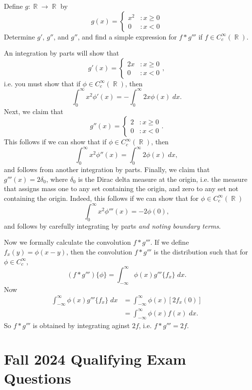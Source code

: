 \documentclass[answers]{exam}
\DeclareMathOperator{\RR}{\mathbb{R}}
\begin{document}
\begin{questions}
\question Define $g: \RR \to \RR$ by
%
\[ g(x) = \begin{cases} x^2 &: x \geq 0 \\ 0 &: x < 0 \end{cases} \]
%
Determine $g'$, $g''$, and $g''$, and find a simple expression for $f * g'''$ if $f \in C_c^\infty(\RR)$.
\begin{solution}
	An integration by parts will show that
	\[ g'(x) = \begin{cases} 2x &: x \geq 0 \\ 0 &: x < 0 \end{cases}, \]
	i.e. you must show that if $\phi \in C_c^\infty(\RR)$, then
	\[ \int_0^\infty x^2 \phi'(x) = - \int_0^\infty 2x \phi(x)\; dx. \]
	Next, we claim that
	\[ g''(x) = \begin{cases} 2 &: x \geq 0 \\ 0 &: x < 0 \end{cases}. \]
	This follows if we can show that if $\phi \in C_c^\infty(\RR)$, then
	\[ \int_0^\infty x^2 \phi''(x) = \int_0^\infty 2 \phi(x)\; dx, \]
	and follows from another integration by parts. Finally, we claim that $g'''(x) = 2 \delta_0$, where $\delta_0$ is the Dirac delta measure at the origin, i.e. the measure that assigns mass one to any set containing the origin, and zero to any set not containing the origin. Indeed, this follows if we can show that for $\phi \in C_c^\infty(\RR)$
	\[ \int_0^\infty x^2 \phi'''(x) = - 2 \phi(0), \]
	and follows by carefully integrating by parts \emph{and noting boundary terms}.

	Now we formally calculate the convolution $f * g'''$. If we define $f_x(y) = \phi(x - y)$, then the convolution $f * g'''$ is the distribution such that for $\phi \in C_c^\infty$,
	\[ (f * g''') \{ \phi \} = \int_{-\infty}^\infty \phi(x) g''' \{ f_x \}\; dx. \]
	Now
	\begin{align*}
		\int_{-\infty}^\infty \phi(x) g''' \{ f_x \}\; dx &= \int_{-\infty}^\infty \phi(x) [ 2f_x(0) ]\\
		&= \int_{-\infty}^\infty \phi(x) f(x)\; dx.
	\end{align*}
	So $f * g'''$ is obtained by integrating aginst $2f$, i.e. $f * g''' = 2f$.
\end{solution}

\newpage
\section{Fall 2024 Qualifying Exam Questions}


\end{questions}
\end{document}
